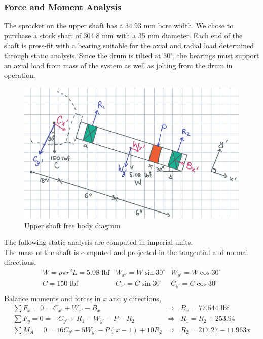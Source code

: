 \documentclass[letterpaper,12pt]{article}
\begin{document}
\subsubsection{Force and Moment Analysis}
The sprocket on the upper shaft has a 34.93 mm bore width. We chose to purchase a stock shaft of 304.8 mm with a 35 mm diameter. Each end of the shaft is press-fit with a bearing suitable for the axial and radial load determined through static analysis. Since the drum is tilted at $30^{\circ} $, the bearings must support an axial load from mass of the system as well as jolting from the drum in operation. 

\begin{figure}[h]
    \centering
    \includegraphics[width=12cm]{A3/MECH325A3FBD.jpg}
    \caption{Upper shaft free body diagram}
\end{figure}
    
\noindent The following static analysis are computed in imperial units.\\
The mass of the shaft is computed and projected in the tangential and normal directions.
\[ \begin{array}{lll}%
 W = \rho \pi r^2 L = 5.08 \text{ lbf} &  W_{x'} = W\sin{30^\circ}  &  W_{y'} = W\cos{30^\circ}\\
C = 150 \text{ lbf} &  C_{x'} = C\sin{30^\circ} &  C_{y'} = C\cos{30^\circ}\\
\end{array}\]%
Balance moments and forces in $x$ and $y$ directions,
\[ \begin{array}{lll}%
 \sum F_x = 0 = C_{x'} + W_{x'} - B_{x} &\Rightarrow& B_{x} = 77.544 \text{ lbf}\\
 \sum F_y = 0 = -C_{y'} + R_1 - W_{y'} - P - R_2 &\Rightarrow& R_1 = R_2 + 253.94\\
 \sum M_{A} = 0 = 16C_{y'} - 5W_{y'} - P(x-1) + 10R_2 &\Rightarrow& R_2 = 217.27 - 11.963x
\end{array}\]%
\end{document}
